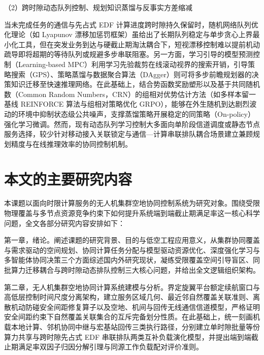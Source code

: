 （2）跨时隙动态队列控制、规划知识蒸馏与反事实方差缩减

当未完成任务的通信与先占式 EDF 计算进度\cite{liu1973scheduling}跨时隙持久保留时，随机网络队列优化理论（如 Lyapunov 漂移加惩罚框架）\cite{neely2010stochastic,sohn2025joint}虽给出了长期队列稳定与单步贪心上界最小化工具，但在突发业务到达与硬截止期淘汰耦合下，短视漂移控制难以提前机动疏导即将超期的等待队列或规避多步串联阻塞。另一方面，学习引导的模型预测控制（Learning-based MPC）\cite{hewing2020learning}利用学习先验裁剪在线滚动视界的搜索开销，引导策略搜索（GPS）\cite{levine2013guided}、策略蒸馏\cite{rusu2015distillation}与数据聚合算法（DAgger）\cite{ross2011dagger}则可将多步前瞻规划器的决策知识迁移至快速推理网络。在此基础上，结合势函数奖励塑形\cite{ng1999policy}以及基于共同随机数（Common Random Numbers，CRN）的组相对优势估计方法（如多样本留一基线 REINFORCE 算法\cite{kool2019buy}与组相对策略优化 GRPO\cite{shao2024deepseekmath}），能够在外生随机到达剧烈波动的环境中抑制状态级公共噪声，支撑蒸馏策略开展稳定的同策略（On-policy）强化学习微调。然而，现有动态队列学习控制大多面向单阶段信道调度或静态节点服务选择，较少针对移动接入关联锁定与通信—计算串联排队耦合场景建立兼顾规划精度与在线推理效率的协同控制机制。

\section{本文的主要研究内容}
\label{sec:contributions}
\label{sec:arrangement}

本课题以面向时限计算服务的无人机集群空地协同控制系统为研究对象。围绕受限物理覆盖与多节点资源竞争约束下如何提升系统端到端截止期满足率这一核心科学问题，全文各部分研究内容安排如下：

第一章，绪论。阐述课题的研究背景、目的与低空工程应用意义，从集群协同覆盖与需求驱动的空间规划、协同计算任务分配与模型驱动资源优化、深度强化学习与多智能体协同决策三个方面综述国内外研究现状，凝练受限覆盖空间引导盲区、同批算力迁移耦合与跨时隙动态排队控制三大核心问题，并给出全文逻辑组织架构。

第二章，无人机集群空地协同计算系统建模与分析。界定旋翼平台额定续航窗口与高低层控制时间尺度分离架构，建立服务区域几何、最近邻自然覆盖关联准则、离散机动防碰安全间距修复算子以及空地、机间与回传无线通信信道模型，严格证明安全间距约束下自然覆盖关联集合的互斥完备划分性质。在此基础上，统一刻画机载本地计算、邻机协同中继与宏基站回传三类执行路径，分别建立单时隙批量等份算力共享与跨时隙先占式 EDF 串联排队两类互补负载演化模型，并提出端到端截止期满足率双因子归因分解引理与同源工作负载配对评价准则。

